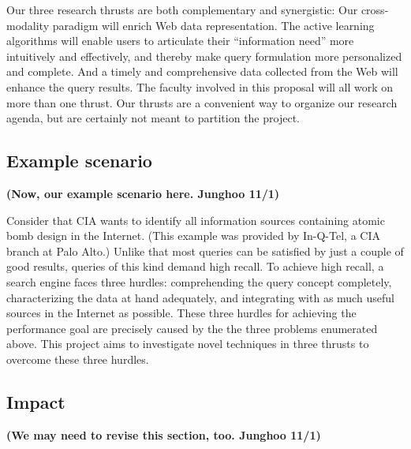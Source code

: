 Our three research thrusts are both complementary and synergistic: Our
cross-modality paradigm will enrich Web data representation.  The
active learning algorithms will enable users to articulate their
``information need'' more intuitively and effectively, and thereby
make query formulation more personalized and complete.  And a timely
and comprehensive data collected from the Web will enhance the query
results.  The faculty involved in this proposal will all work on more
than one thrust.
Our thrusts are a convenient way to organize our research agenda, but
are certainly not meant to partition the project.


\subsection{Example scenario}

{\bf (Now, our example scenario here. Junghoo 11/1)}

Consider that CIA wants to identify all information sources 
containing atomic bomb design in the Internet.
(This example was provided by In-Q-Tel, a CIA branch at Palo Alto.)
Unlike that most queries can be satisfied by just a couple of
good results, queries of this kind demand high recall.
To achieve high recall, a search engine
faces three hurdles:
comprehending the query concept completely, 
characterizing the data at hand adequately, 
and integrating with as much useful sources in the Internet 
as possible.
These three hurdles for achieving the performance goal are
precisely caused by the the three problems enumerated above.
This project aims to investigate novel 
techniques in three thrusts to overcome these three hurdles.



\subsection{Impact}
{\bf (We may need to revise this section, too. Junghoo 11/1)}


